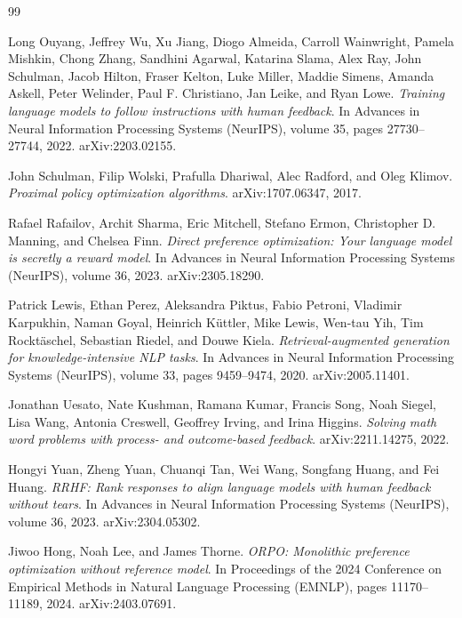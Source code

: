 \begin{thebibliography}{99}

Long Ouyang, Jeffrey Wu, Xu Jiang, Diogo Almeida, Carroll Wainwright, Pamela Mishkin, Chong Zhang, Sandhini Agarwal, Katarina Slama, Alex Ray, John Schulman, Jacob Hilton, Fraser Kelton, Luke Miller, Maddie Simens, Amanda Askell, Peter Welinder, Paul F. Christiano, Jan Leike, and Ryan Lowe.
\textit{Training language models to follow instructions with human feedback}.
In Advances in Neural Information Processing Systems (NeurIPS), volume 35, pages 27730--27744, 2022.
arXiv:2203.02155.

John Schulman, Filip Wolski, Prafulla Dhariwal, Alec Radford, and Oleg Klimov.
\textit{Proximal policy optimization algorithms}.
arXiv:1707.06347, 2017.

Rafael Rafailov, Archit Sharma, Eric Mitchell, Stefano Ermon, Christopher D. Manning, and Chelsea Finn.
\textit{Direct preference optimization: Your language model is secretly a reward model}.
In Advances in Neural Information Processing Systems (NeurIPS), volume 36, 2023.
arXiv:2305.18290.

Patrick Lewis, Ethan Perez, Aleksandra Piktus, Fabio Petroni, Vladimir Karpukhin, Naman Goyal, Heinrich K\"uttler, Mike Lewis, Wen-tau Yih, Tim Rockt\"aschel, Sebastian Riedel, and Douwe Kiela.
\textit{Retrieval-augmented generation for knowledge-intensive NLP tasks}.
In Advances in Neural Information Processing Systems (NeurIPS), volume 33, pages 9459--9474, 2020.
arXiv:2005.11401.

Jonathan Uesato, Nate Kushman, Ramana Kumar, Francis Song, Noah Siegel, Lisa Wang, Antonia Creswell, Geoffrey Irving, and Irina Higgins.
\textit{Solving math word problems with process- and outcome-based feedback}.
arXiv:2211.14275, 2022.

Hongyi Yuan, Zheng Yuan, Chuanqi Tan, Wei Wang, Songfang Huang, and Fei Huang.
\textit{RRHF: Rank responses to align language models with human feedback without tears}.
In Advances in Neural Information Processing Systems (NeurIPS), volume 36, 2023.
arXiv:2304.05302.

Jiwoo Hong, Noah Lee, and James Thorne.
\textit{ORPO: Monolithic preference optimization without reference model}.
In Proceedings of the 2024 Conference on Empirical Methods in Natural Language Processing (EMNLP), pages 11170--11189, 2024.
arXiv:2403.07691.


\end{thebibliography}
